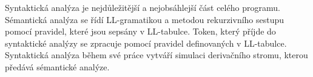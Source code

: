 \documentclass[../main.tex]{subfiles}
\begin{document}
Syntaktická analýza je nejdůležitější a nejobsáhlejší část celého programu. Sémantická analýza se řídí LL-gramatikou a metodou rekurzivního sestupu pomocí pravidel, které jsou sepsány v LL-tabulce. Token, který příjde do syntaktické analýzy se zpracuje pomocí pravidel definovaných v LL-tabulce.\\
Syntaktická analýza během své práce vytváří simulaci derivačního stromu, kterou předává sémantické analýze.
\end{document}
